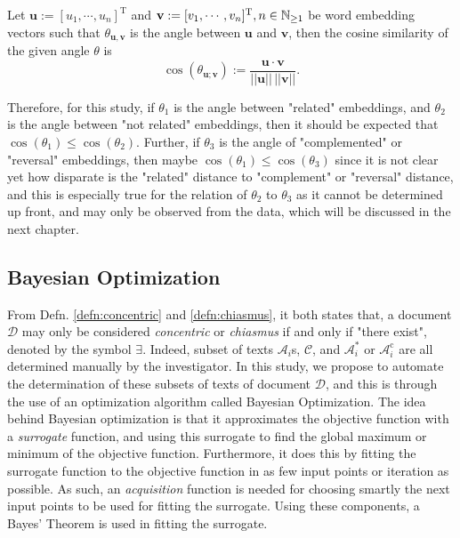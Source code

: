 \begin{defn}\label{defn:cosine_similarity}
    Let $\mathbf{u}:=[u_1,\cdots,u_n]^{\text{T}}$ and $\mathbf{v}:=[v_1,\cdots,v_n]^{\text{T}},\linebreak n\in\mathbb{N}_{\geq 1}$ be word embedding vectors such that $\theta_{\mathbf{u},\mathbf{v}}$ is the angle between $\mathbf{u}$ and $\mathbf{v}$, then the cosine similarity of the given angle $\theta$ is
    \begin{equation}
        \cos(\theta_{\mathbf{u};\mathbf{v}}):=\frac{\mathbf{u}\cdot\mathbf{v}}{||\mathbf{u}||\,||\mathbf{v}||}.
    \end{equation}
\end{defn}
Therefore, for this study, if $\theta_1$ is the angle between "related"   embeddings, and $\theta_2$ is the angle between "not related"   embeddings, then it should be expected that $\cos(\theta_1)\leq\cos(\theta_2)$. Further, if $\theta_3$ is the angle of "complemented" or "reversal"   embeddings, then maybe $\cos(\theta_1)\leq\cos(\theta_3)$ since it is not clear yet how disparate is the "related" distance to "complement" or "reversal" distance, and this is especially true for the relation of $\theta_2$ to $\theta_3$ as it cannot be determined up front, and may only be observed from the data, which will be discussed in the next chapter.
\subsection{Bayesian Optimization}\label{sec:bayes-opt}
From Defn. \ref{defn:concentric} and \ref{defn:chiasmus}, it both states that, a document $\mathscr{D}$ may only be considered \textit{concentric} or \textit{chiasmus} if and only if "there exist", denoted by the symbol $\exists$. Indeed, subset of texts $\mathscr{A}_i$s, $\mathscr{C}$, and $\mathscr{A}_i^{*}$ or $\mathscr{A}_i^{\text{c}}$ are all determined manually by the investigator. In this study, we propose to automate the determination of these subsets of texts of document $\mathscr{D}$, and this is through the use of an optimization algorithm called Bayesian Optimization. The idea behind Bayesian optimization is that it approximates the objective function with a \textit{surrogate} function, and using this surrogate to find the global maximum or minimum of the objective function. Furthermore, it does this by fitting the surrogate function to the objective function in as few input points or iteration as possible. As such, an \textit{acquisition} function is needed for choosing smartly the next input points to be used for fitting the surrogate. Using these components, a Bayes' Theorem is used in fitting the surrogate.

